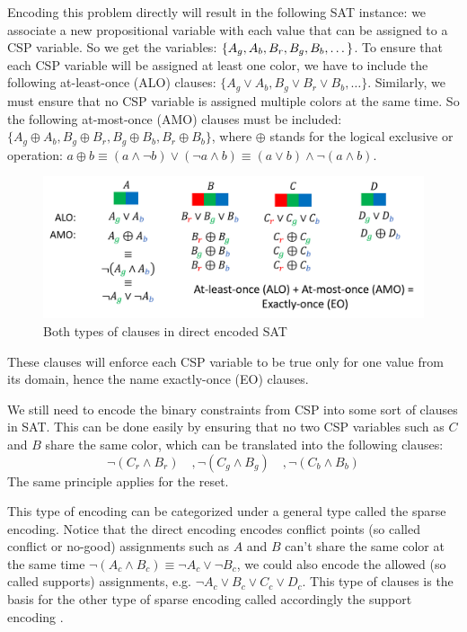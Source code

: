 Encoding this problem directly will result in the following SAT instance: we associate a new propositional variable with each value that can be assigned to a CSP variable. So we get the variables: $\{ A_g, A_b, B_r, B_g,\\ B_b, \dots\}$. To ensure that each CSP variable will be assigned at least one color, we have to include the following at-least-once (ALO) clauses: $\{ A_g \vee A_b, B_g \vee B_r \vee B_b, \dots \}$. Similarly, we must ensure that no CSP variable is assigned multiple colors at the same time. So the following at-most-once (AMO) clauses must be included: $\{ A_g \oplus A_b, B_g \oplus B_r, B_g \oplus B_b, B_r \oplus B_b \} $, where $\oplus$ stands for the logical exclusive or operation: $a \oplus b \equiv (a \wedge \neg b) \vee (\neg a \wedge b) \equiv (a \vee b) \wedge \neg (a \wedge b)$.
\begin{figure}[H]
	\centering
	\includegraphics[width=0.75\linewidth]{assets/alo_amo}
	\captionsetup{justification=centering,margin=2cm}
	\caption{Both types of clauses in direct encoded SAT}
	\label{fig:alo_amo}
\end{figure}  
These clauses will enforce each CSP variable to be true only for one value from its domain, hence the name exactly-once (EO) clauses.

We still need to encode the binary constraints from CSP into some sort of clauses in SAT. This can be done easily by ensuring that no two CSP variables such as $C$ and $B$ share the same color, which can be translated into the following clauses:
$$
	\neg (C_r \wedge B_r) \quad, \neg (C_g \wedge B_g) \quad, \neg (C_b \wedge B_b)
$$
The same principle applies for the reset.

This type of encoding can be categorized under a general type called the sparse encoding. Notice that the direct encoding encodes conflict points (so called conflict or no-good) assignments such as $A$ and $B$ can't share the same color at the same time $\neg (A_c \wedge B_c) \equiv \neg A_c \vee \neg B_c$, we could also encode the allowed (so called supports) assignments, e.g. $\neg A_c \vee B_c \vee C_c \vee D_c$. This type of clauses is the basis for the other type of sparse encoding called accordingly the support encoding \cite{petke2011order}.

